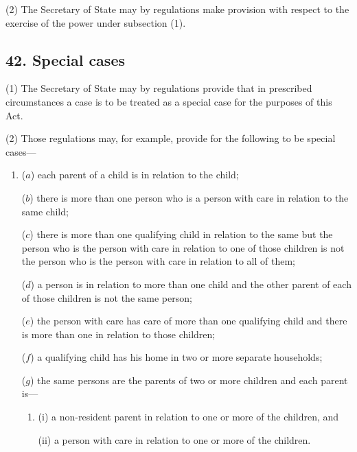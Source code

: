 \documentclass[12pt,a4paper]{article}
\begin{document}
(2)
The Secretary of State may by regulations make provision with respect to the exercise of the power under subsection (1).


\subsection{42. Special cases}

(1) The Secretary of State may by regulations provide that in prescribed 
circumstances a case is to be treated as a special case for the purposes of this Act.

(2)
Those regulations may, for example, provide for the following to be special cases---
\begin{enumerate}\item[]
($a$) each parent of a child is  in relation
to the child;

($b$) there is more than one person who is a person with care in relation to the
same child;

($c$) there is more than one qualifying child in relation to the same  but the person who is the person with care in
relation to one of those children is not the person who is the person with
care in relation to all of them;

($d$) a person is  in relation to more than
one child and the other parent of each of those children is not the same
person;

($e$) the person with care has care of more than one qualifying child and there
is more than one  in relation to those
children;

($f$) a qualifying child has his home in two or more separate households;

($g$) the same persons are the parents of two or more children and each parent is---
\begin{enumerate}\item[]
(i) a non-resident parent in relation to one or more of the children, and

(ii) a person with care in relation to one or more of the children.
\end{enumerate}
\end{enumerate}
\end{document}
